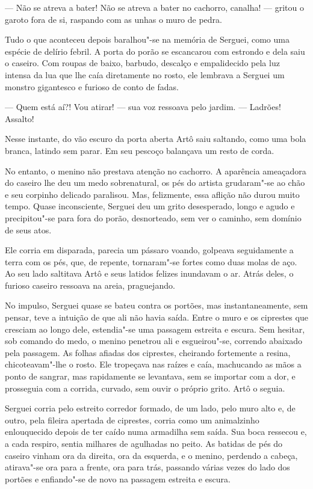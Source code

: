 --- Não se atreva a bater! Não se atreva a bater no cachorro, canalha!
--- gritou o garoto fora de si, raspando com as unhas o muro de pedra.

Tudo o que aconteceu depois baralhou"-se na memória de Serguei, como uma
espécie de delírio febril. A porta do porão se escancarou com estrondo e
dela saiu o caseiro. Com roupas de baixo, barbudo, descalço e
empalidecido pela luz intensa da lua que lhe caía diretamente no rosto,
ele lembrava a Serguei um monstro gigantesco e furioso de conto de
fadas.

--- Quem está aí?! Vou atirar! --- sua voz ressoava pelo jardim. ---
Ladrões! Assalto!

Nesse instante, do vão escuro da porta aberta Artô saiu saltando, como uma
bola branca, latindo sem parar. Em seu pescoço balançava um resto
de corda.

No entanto, o menino não prestava atenção no cachorro. A aparência
ameaçadora do caseiro lhe deu um medo sobrenatural, os pés do artista
grudaram"-se ao chão e seu corpinho delicado paralisou. Mas, felizmente,
essa aflição não durou muito tempo. Quase inconsciente, Serguei deu um
grito desesperado, longo e agudo e precipitou"-se para fora do porão,
desnorteado, sem ver o caminho, sem domínio de seus atos.

Ele corria em disparada, parecia um pássaro voando, golpeava
seguidamente a terra com os pés, que, de repente, tornaram"-se fortes
como duas molas de aço. Ao seu lado saltitava Artô e seus latidos
felizes inundavam o ar. Atrás deles, o furioso caseiro ressoava na
areia, praguejando.

No impulso, Serguei quase se bateu contra os portões, mas
instantaneamente, sem pensar, teve a intuição de que ali não havia
saída. Entre o muro e os ciprestes que cresciam ao longo dele,
estendia"-se uma passagem estreita e escura. Sem hesitar, sob comando do
medo, o menino penetrou ali e esgueirou"-se, correndo abaixado pela
passagem. As folhas afiadas dos ciprestes, cheirando fortemente a
resina, chicoteavam"-lhe o rosto. Ele tropeçava nas raízes e caía,
machucando as mãos a ponto de sangrar, mas rapidamente se levantava, sem
se importar com a dor, e prosseguia com a corrida, curvado, sem ouvir o
próprio grito. Artô o seguia.

Serguei corria pelo estreito corredor formado, de um lado, pelo muro
alto e, de outro, pela fileira apertada de ciprestes, corria como um
animalzinho enlouquecido depois de ter caído numa armadilha sem saída.
Sua boca ressecou e, a cada respiro, sentia milhares de agulhadas no
peito. As batidas de pés do caseiro vinham ora da direita, ora da
esquerda, e o menino, perdendo a cabeça, atirava"-se ora para a frente,
ora para trás, passando várias vezes do lado dos portões e enfiando"-se
de novo na passagem estreita e escura.

